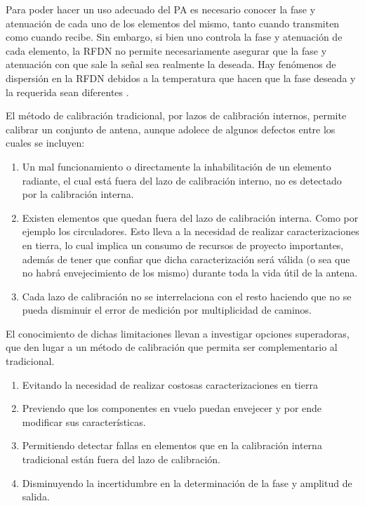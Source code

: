 Para poder hacer un uso adecuado del PA es necesario conocer la fase y atenuación de cada uno de los elementos del mismo, tanto
cuando transmiten como cuando recibe. Sin embargo, si bien uno controla la fase y atenuación de cada elemento, la RFDN no permite
necesariamente asegurar que la fase y atenuación con que sale la señal sea realmente la deseada. Hay fenómenos de dispersión en
la RFDN debidos a la temperatura que hacen que la fase deseada y la requerida sean diferentes \cite{Keizer2011}.

El método de calibración tradicional, por lazos de calibración internos, permite calibrar un conjunto de antena, aunque
adolece de algunos defectos entre los cuales se incluyen:

\begin{enumerate}
    \item Un mal funcionamiento o directamente la inhabilitación de un elemento radiante, el cual está fuera del lazo de
		calibración interno, no es detectado por la calibración interna.
    \item Existen elementos que quedan fuera del lazo de calibración interna. Como por ejemplo los circuladores. Esto lleva a
		la necesidad de realizar caracterizaciones en tierra, lo cual implica un consumo de recursos de proyecto importantes,
		además de tener que confiar que dicha caracterización será válida (o sea que no habrá envejecimiento de los mismo)
		durante toda la vida útil de la antena.
    \item Cada lazo de calibración no se interrelaciona con el resto haciendo que no se pueda disminuir el error de medición por
		multiplicidad de caminos.
\end{enumerate}

El conocimiento de dichas limitaciones llevan a investigar opciones superadoras, que den lugar a un método de calibración que 
permita ser complementario al tradicional. 
\begin{enumerate}
	\item Evitando la necesidad de realizar costosas caracterizaciones en tierra
	\item Previendo que los componentes en vuelo puedan envejecer y por ende modificar sus características.
	\item Permitiendo detectar fallas en elementos que en la calibración interna tradicional están fuera del lazo de calibración.
	\item Disminuyendo la incertidumbre en la determinación de la fase y amplitud de salida.
\end{enumerate}


